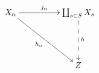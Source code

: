 \documentclass{standalone}
\begin{document}
\Large
\(\displaystyle
\xymatrix@C+24pt@R+24pt{
X_\alpha  \ar[rd]_{h_\alpha} \ar[r]^{j_\alpha}  & \coprod_{s\in S} X_s \ar@{-->}[d]^{h}
  \\
& Z  
}
\)
\end{document}
